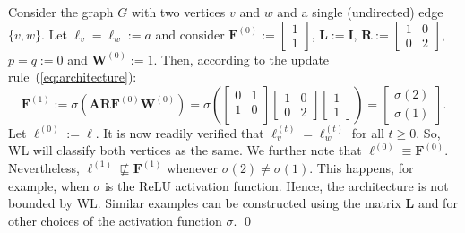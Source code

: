 \begin{example}\label{ex1}\normalfont
Consider the graph $G$ with two vertices $v$ and $w$ and a single (undirected) edge $\{v,w\}$. Let $\pmb{\ell}_v=\pmb{\ell}_w:=a$ and consider  $\mathbf{F}^{(0)}:=\left[\begin{smallmatrix}1\\1\end{smallmatrix}\right]$, $\mathbf{L}:=\mathbf{I}$,
 $\mathbf{R}:=\left[\begin{smallmatrix}1 & 0\\0& 2\end{smallmatrix}\right]$, $p=q:=0$ and $\mathbf{W}^{(0)}:=1$.
Then, according to the update rule~(\ref{eq:architecture}):
$$
\mathbf{F}^{(1)}:=\sigma\left(\mathbf{A}\mathbf{R}\mathbf{F}^{(0)}\mathbf{W}^{(0)}\right)=
\sigma\left(\begin{bmatrix}
0& 1 \\
1 & 0\\
\end{bmatrix}\begin{bmatrix}1 & 0\\0& 2\end{bmatrix}\begin{bmatrix}1\\1\end{bmatrix}\right)=\begin{bmatrix}\sigma(2)\\\sigma(1)\end{bmatrix}.
$$
Let 
$\pmb{\ell}^{(0)}:=\pmb{\ell}$.
It is now readily verified that $\pmb{\ell}^{(t)}_v=\pmb{\ell}^{(t)}_w$ for all $t\geq 0$. So, WL will classify both vertices as the same. We further note that  $\pmb{\ell}^{(0)}\equiv \mathbf{F}^{(0)}$. Nevertheless, $\pmb{\ell}^{(1)}\not\sqsubseteq \mathbf{F}^{(1)}$ whenever $\sigma(2)\neq\sigma(1)$. This happens, for example, when $\sigma$ is the ReLU activation function. Hence, the architecture is not bounded by WL. Similar examples can be constructed using the matrix $\mathbf{L}$  and for other choices of the activation function $\sigma$. \qed
\end{example}



